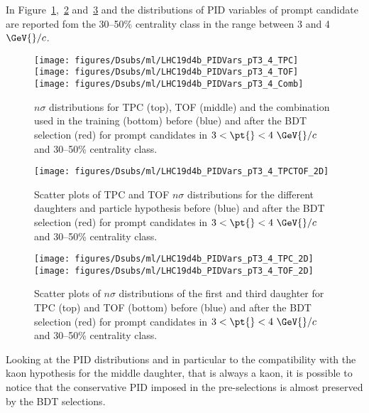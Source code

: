 In Figure~\ref{fig:PID_1D_3050_pt3_4},~\ref{fig:PID_2D_3050_pt3_4_TPCTOF} and~\ref{fig:PID_2D_3050_pt3_4} and the distributions of PID variables of prompt \Dsubs{} candidate are reported fom the 30--50\% centrality class 
in the \pt{} range between 3 and 4 \(\GeV{}/c\). \\
\begin{figure}[htbp]
  \begin{center}
   \texttt{[image: figures/Dsubs/ml/LHC19d4b\_PIDVars\_pT3\_4\_TPC]}
   \texttt{[image: figures/Dsubs/ml/LHC19d4b\_PIDVars\_pT3\_4\_TOF]}
   \texttt{[image: figures/Dsubs/ml/LHC19d4b\_PIDVars\_pT3\_4\_Comb]}
  \caption{\(n\sigma\) distributions for TPC (top), TOF (middle) and the combination used in the training (bottom) before (blue) and after the BDT selection (red) for prompt \Dsubs{} candidates in \(3 < \pt{} < 4~\GeV{}/c\) and 30--50\% centrality class.}
  \label{fig:PID_1D_3050_pt3_4}
  \end{center}
\end{figure}
\begin{figure}[htbp]
  \begin{center}
   \texttt{[image: figures/Dsubs/ml/LHC19d4b\_PIDVars\_pT3\_4\_TPCTOF\_2D]}
  \caption{Scatter plots of TPC and TOF \(n\sigma\) distributions for the different daughters and particle hypothesis before (blue) and after the BDT selection (red) for prompt \Dsubs{} candidates in \(3 < \pt{} < 4~\GeV{}/c\) and 30--50\% centrality class.}
  \label{fig:PID_2D_3050_pt3_4_TPCTOF}
  \end{center}
\end{figure}
\begin{figure}[htbp]
  \begin{center}
   \texttt{[image: figures/Dsubs/ml/LHC19d4b\_PIDVars\_pT3\_4\_TPC\_2D]}
   \texttt{[image: figures/Dsubs/ml/LHC19d4b\_PIDVars\_pT3\_4\_TOF\_2D]}
  \caption{Scatter plots of \(n\sigma\) distributions of the first and third \Dsubs{} daughter for TPC (top) and TOF (bottom) before (blue) and after the BDT selection (red) for prompt \Dsubs{} candidates in \(3 < \pt{} < 4~\GeV{}/c\) and 30--50\% centrality class.}
  \label{fig:PID_2D_3050_pt3_4}
  \end{center}
\end{figure}
Looking at the PID distributions and in particular to the compatibility with the kaon hypothesis for the middle daughter, that is always a kaon, it is possible to notice that the 
conservative PID imposed in the pre-selections is almost preserved by the BDT selections. 